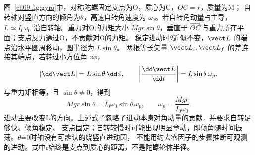 图~\ref{ch09:fig:gyro}中，对称陀螺固定支点为O，质心为C，$OC=r$，质量为M；
自转轴对竖直方向的倾角为$\theta$，高速自转角速度为 $\omega_0$。若自转角动量占主导，
$L\simeq I_0\omega_0$ 沿自转轴。重力对O的力矩大小 $Mgr\sin\theta$，垂直于
$\overrightarrow{OC}$ 与重力所在平面；支点反力通过O，不贡献对O的力矩。
\gyroDiagram
稳定进动时$\theta$近似不变，$\vect L$ 的端点沿水平圆周移动，圆半径为 $L\sin\theta$。
两根等长矢量 $\vect L_i,\vect L_f$ 的差连接其端点，若转过小方位角 $\dd\phi$，
\begin{equation}
 |\dd\vect L|=L\sin\theta\,\dd\phi,
 \qquad \left|\frac{\dd\vect L}{\dd t}\right|=L\sin\theta\,\omega_p.
\end{equation}
与重力矩相等，且 $\sin\theta\ne0$，得到
\begin{equation}
 Mgr\sin\theta=I_0\omega_0\sin\theta\,\omega_p,
 \qquad \boxed{\omega_p=\frac{Mgr}{I_0\omega_0}}.
\end{equation}
进动主要改变L的方向。上述式子忽略了进动本身对角动量的贡献，并要求自转足够快、倾角稳定、
支点固定；自转较慢时可能出现明显章动，即倾角随时间振荡。$\theta$=0时轴没有可辨认的绕竖直进动圆，
不能用约去零因子的步骤推断可观测的进动。式中r始终是支点到质心的距离，不是陀螺轮体半径。
